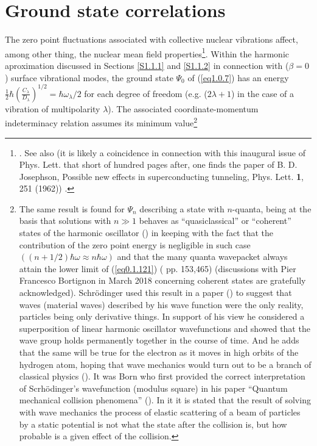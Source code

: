 \section{Ground state correlations}\label{S1.8}
The zero point fluctuations associated with collective nuclear vibrations affect, among other thing, the nuclear mean field properties\footnote{\cite{Gogny:78,Esbensen:83,Reinhard:79,Khodel:82,Barranco:87a,Barranco:85}. See also \cite{Brown:63,Anderson:62} (it is likely a coincidence in connection with this inaugural issue of Phys. Lett. that short of hundred pages after, one finds the paper of B. D. Josephson, Possible new effects in superconducting tunneling, Phys. Lett. \textbf{1}, 251 (1962)) .}. Within the harmonic aproximation discussed in Sections \ref{S1.1.1} and \ref{S1.1.2} in connection with ($\beta=0$) surface vibrational modes, the ground state $\Psi_0$ of (\ref{eq1.0.7}) has an energy $\frac{1}{2}\hbar\left(\frac{C_\lambda}{D_\lambda}\right)^{1/2}=\hbar\omega_\lambda/2$ for each degree of freedom (e.g. ($2\lambda+1$) in the case of a vibration of multipolarity $\lambda$). The associated coordinate-momentum indeterminacy relation assumes its minimum value\footnote{The same result is found for $\Psi_n$ describing a state with $n$-quanta, being at the basis that solutions with $n\gg1$ behaves as ``quasiclassical'' or ``coherent'' states of the harmonic oscillator (\cite{Glauber:07}) in keeping with the fact that the contribution of the zero point energy is negligible in such case $((n+1/2)\hbar\omega\approx n\hbar\omega)$ and that the many quanta wavepacket always attain the lower limit of (\ref{eq0.1.121}) (\cite{Basdevant:05} pp. 153,465) (discussions with Pier Francesco Bortignon in March 2018 concerning coherent states are gratefully acknowledged). Schr\"odinger used this result  in a paper (\cite{Schrodinger:26}) to suggest that waves (material waves) described by his wave function were the only reality, particles being only derivative things. In support of his view he considered a superposition of linear harmonic oscillator wavefunctions and showed that the wave group holds permanently together in the course of time. And he adds that the same will be true for the electron as it moves in high orbits of the hydrogen atom, hoping that wave mechanics would turn out to be a branch of classical physics (\cite{Pais:00}). It was Born who first provided the correct interpretation of Scrh\"odinger's wavefunction (modulus square) in his paper ``Quantum mechanical collision phenomena'' (\cite{Born:26}). In it it is stated that the result of solving with wave mechanics the process of elastic scattering of a beam of particles by a static potential is not what the state after the collision is, but how probable is a given effect of the collision.}
